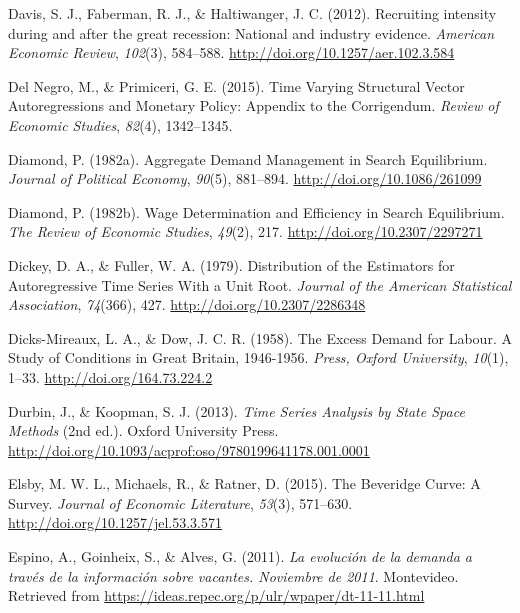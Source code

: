 \documentclass[12pt,oneside]{reedthesis}
\begin{document}
\leavevmode\hypertarget{ref-Haltiwanger2012}{}%
Davis, S. J., Faberman, R. J., \& Haltiwanger, J. C. (2012). Recruiting intensity during and after the great recession: National and industry evidence. \emph{American Economic Review}, \emph{102}(3), 584--588. \url{http://doi.org/10.1257/aer.102.3.584}

\leavevmode\hypertarget{ref-DelNegro2015}{}%
Del Negro, M., \& Primiceri, G. E. (2015). Time Varying Structural Vector Autoregressions and Monetary Policy: Appendix to the Corrigendum. \emph{Review of Economic Studies}, \emph{82}(4), 1342--1345.

\leavevmode\hypertarget{ref-Diamond1982}{}%
Diamond, P. (1982a). Aggregate Demand Management in Search Equilibrium. \emph{Journal of Political Economy}, \emph{90}(5), 881--894. \url{http://doi.org/10.1086/261099}

\leavevmode\hypertarget{ref-Diamond1982B}{}%
Diamond, P. (1982b). Wage Determination and Efficiency in Search Equilibrium. \emph{The Review of Economic Studies}, \emph{49}(2), 217. \url{http://doi.org/10.2307/2297271}

\leavevmode\hypertarget{ref-DickeyFuller1979}{}%
Dickey, D. A., \& Fuller, W. A. (1979). Distribution of the Estimators for Autoregressive Time Series With a Unit Root. \emph{Journal of the American Statistical Association}, \emph{74}(366), 427. \url{http://doi.org/10.2307/2286348}

\leavevmode\hypertarget{ref-Dicks-Mireaux1958}{}%
Dicks-Mireaux, L. A., \& Dow, J. C. R. (1958). The Excess Demand for Labour. A Study of Conditions in Great Britain, 1946-1956. \emph{Press, Oxford University}, \emph{10}(1), 1--33. \url{http://doi.org/164.73.224.2}

\leavevmode\hypertarget{ref-Durbin2013}{}%
Durbin, J., \& Koopman, S. J. (2013). \emph{Time Series Analysis by State Space Methods} (2nd ed.). Oxford University Press. \url{http://doi.org/10.1093/acprof:oso/9780199641178.001.0001}

\leavevmode\hypertarget{ref-Elsby2015}{}%
Elsby, M. W. L., Michaels, R., \& Ratner, D. (2015). The Beveridge Curve: A Survey. \emph{Journal of Economic Literature}, \emph{53}(3), 571--630. \url{http://doi.org/10.1257/jel.53.3.571}

\leavevmode\hypertarget{ref-Alma2011}{}%
Espino, A., Goinheix, S., \& Alves, G. (2011). \emph{La evolución de la demanda a través de la información sobre vacantes. Noviembre de 2011}. Montevideo. Retrieved from \url{https://ideas.repec.org/p/ulr/wpaper/dt-11-11.html}
\end{document}
